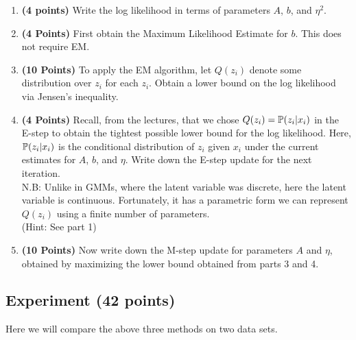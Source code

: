 \begin{enumerate}
\item \textbf{(4 points)}
Write the log likelihood in terms of parameters $A$, $b$, and $\eta^2$.

\item \textbf{(4 Points)}
First obtain the Maximum Likelihood Estimate for $b$. This does not require EM.

\item \textbf{(10 Points)}
To apply the EM algorithm,
let $Q(z_i)$  denote some distribution over $z_i$ for each $z_i$.
Obtain a lower bound on the log likelihood via Jensen's inequality.

\item \textbf{(4 Points)}
Recall, from the lectures, that we chose
$Q(z_i) =  \mathbb{P}(z_i|x_i)$ in the E-step to obtain the tightest
possible lower bound for the log likelihood.
Here, $ \mathbb{P}(z_i|x_i)$ is the conditional distribution of $z_i$
given $x_i$ under the current estimates for $A$, $b$, and $\eta$.
Write down the E-step update for the next iteration. \\
N.B: Unlike in GMMs, where the latent variable was discrete, here the latent variable is continuous. Fortunately, it has a parametric form we can represent $Q(z_i)$ using a finite number of parameters. \\
(Hint: See part 1)

\item \textbf{(10 Points)}
Now write down the M-step update for parameters $A$ and $\eta$, obtained
by maximizing the lower bound obtained from parts 3 and 4.



\end{enumerate}

 
\subsection{Experiment (42 points)}

Here we will compare the above three methods on two data sets. 

